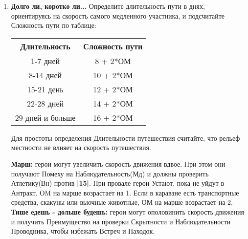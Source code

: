 \begin{enumerate}
    \item \textbf{Долго ли, коротко ли...} Определите длительность пути в днях, ориентируясь на скорость самого медленного участника, и подсчитайте Сложность пути по таблице:
      \begin{center} \begin{tabular}{|c|c|} \hline
        \textbf{Длительность} & \textbf{Сложность пути} \\ \hline
        1-7 дней & 8 + 2*ОМ \\ \hline
        8-14 дней & 10 + 2*ОМ \\ \hline
        15-21 день & 12 + 2*ОМ \\ \hline
        22-28 дней & 14 + 2*ОМ \\ \hline
        29 дней и больше & 16 + 2*ОМ \\ \hline
      \end{tabular} \end{center}
      \begin{tcolorbox}
        Для простоты определения Длительности путешествия считайте, что рельеф местности не влияет на скорость путешествия.
      \end{tcolorbox}
      \textbf{Марш:} герои могут увеличить скорость движения вдвое. При этом они получают Помеху на Наблюдательность(Мд) и должны проверить Атлетику(Вн) против \textbf{|15|}. При провале герои  Устают, пока не уйдут в Антракт. 
      \newline ОM на марше возрастает на 1. Если в караване есть транспортные средства, скакуны или вьючные животные, ОМ на марше возрастает на 2.
      \newline \textbf{Тише едешь - дольше будешь:} герои могут ополовинить скорость движения и получить Преимущество на проверки Скрытности и Наблюдательности Проводника, чтобы избежать Встреч и Находок.


\end{enumerate}
